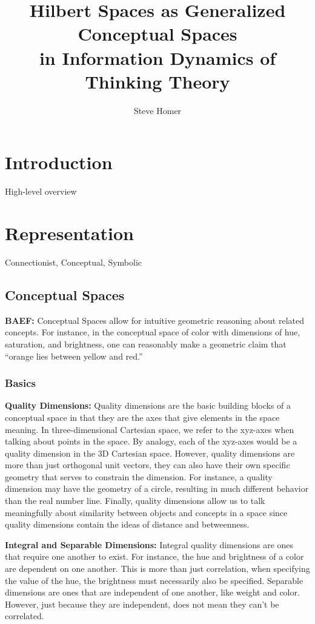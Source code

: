 \documentclass{article}
\title{\textbf{Hilbert Spaces as Generalized Conceptual Spaces} \\
in Information Dynamics of Thinking Theory}
\author{Steve Homer}
\begin{document}
\maketitle

\section{Introduction}
High-level overview


\section{Representation}
Connectionist, Conceptual, Symbolic

\subsection{Conceptual Spaces}
\textbf{BAEF:} Conceptual Spaces allow for intuitive geometric reasoning about related concepts. For instance, in the conceptual space of color with dimensions of hue, saturation, and brightness, one can reasonably make a geometric claim that “orange lies between yellow and red.”

\subsubsection{Basics}

\textbf{Quality Dimensions:}
Quality dimensions are the basic building blocks of a conceptual space in that they are the axes that give elements in the space meaning.  In three-dimensional Cartesian space, we refer to the xyz-axes when talking about points in the space.  By analogy, each of the xyz-axes would be a quality dimension in the 3D Cartesian space.  However, quality dimensions are more than just orthogonal unit vectors, they can also have their own specific geometry that serves to constrain the dimension. For instance, a quality dimension may have the geometry of a circle, resulting in much different behavior than the real number line.  Finally, quality dimensions allow us to talk meaningfully about similarity between objects and concepts in a space since quality dimensions contain the ideas of distance and betweenness.

\textbf{Integral and Separable Dimensions:}
Integral quality dimensions are ones that require one another to exist.  For instance, the hue and brightness of a color are dependent on one another. This is more than just correlation, when specifying the value of the hue, the brightness must necessarily also be specified.  Separable dimensions are ones that are independent of one another, like weight and color.  However, just because they are independent, does not mean they can't be correlated.
\end{document}
